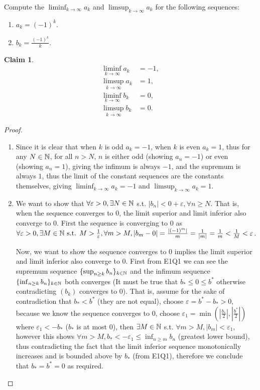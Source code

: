 \documentclass{homework}
\newcommand{\N}{\bb{N}} %
\newcommand{\ra}{\rightarrow}
\newcommand{\?}{\stackrel{?}{=}}
\newcommand{\ep}{\varepsilon}
\theoremstyle{definition}
\newtheorem*{claim}{Claim}
\begin{document}
\question[2] Compute the $\liminf_{k\ra\infty}a_k$ and $\limsup_{k\ra\infty}a_k$ for the following sequences: 
\begin{enumerate}
    \item $a_k=(-1)^k.$
    \item $b_k=\frac{(-1)^k}{k}$.
\end{enumerate}
\begin{claim}
    \begin{align*}
        \liminf_{k\ra\infty}a_k &= -1,\\
        \limsup_{k\ra\infty}a_k &= 1,\\
        \liminf_{k\ra\infty}b_k &= 0,\\
        \limsup_{k\ra\infty}b_k &= 0.
    \end{align*}
\end{claim}
\begin{proof}
    \begin{enumerate}
        \item  Since it is clear that when $k$ is odd $a_k=-1$, when $k$ is even $a_k=1$, thus for any $N\in\N$, for all $n>N$, $n$ is either odd (showing $a_n=-1$) or even (showing $a_n=1$), giving the infimum is always $-1$, and the supremum is always $1$, thus the limit of the constant sequences are the constants themselves, giving $\liminf_{k\ra\infty}a_k = -1$ and $\limsup_{k\ra\infty}a_k = 1$.

        \item We want to show that $\forall \ep >0, \exists N\in\N$ s.t. $|b_n| < 0 + \ep, \forall n\geq N$. That is, when the sequence converges to 0, the limit superior and limit inferior also converge to 0. First the sequence is converging to 0 as $\forall \ep > 0, \exists M\in\N \text{ s.t. } M>\frac{1}{\ep}, \forall m> M, |b_m-0|=\frac{|(-1)^m|}{m}=\frac{1}{|m|}=\frac{1}{m}<\frac{1}{M}<\ep$. 

Now, we want to show the sequence converges to 0 implies the limit superior and limit inferior also converge to 0. First from E1Q1 we can see the supremum sequence $\{\sup_{n\geq k} b_n\}_{k\in\N}$ and the infimum sequence $\{\inf_{n\geq k} b_n\}_{k\in\N}$ both converges (It must be true that $b_*\leq0\leq b^*$ otherwise contradicting $(b_k)$ converges to 0). That is, assume for the sake of contradiction that $b_*<b^*$ (they are not equal), choose $\ep=b^*-b_*>0$, because we know the sequence converges to 0, choose $\ep_1=\min(|\frac{b_*}{2}|, |\frac{b^*}{2}|)$ where $\ep_1 < -b_*$ ($b_* $ is at most 0), then $\exists M\in\N$ s.t. $\forall m>M, |b_m|<\ep_1$, however this shows $\forall m>M, b_*<-\ep_1\leq\inf_{n\geq m}b_n $ (greatest lower bound), thus contradicting the fact that the limit inferior sequence monotonically increases and is bounded above by $b_*$ (from E1Q1), therefore we conclude that $b_*=b^*=0$ as required. 



\end{enumerate}
\end{proof}
\end{document}
